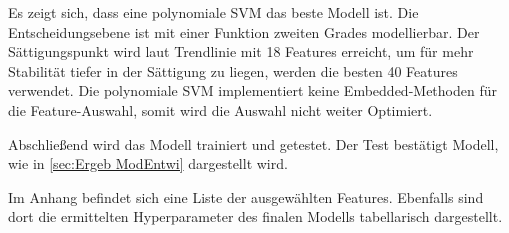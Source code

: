 Es zeigt sich, dass eine polynomiale SVM das beste Modell ist. Die Entscheidungsebene ist mit einer Funktion zweiten Grades modellierbar. Der Sättigungspunkt wird laut Trendlinie mit 18 Features erreicht, um für mehr Stabilität tiefer in der Sättigung zu liegen, werden die besten 40 Features verwendet. Die polynomiale SVM implementiert keine Embedded-Methoden für die Feature-Auswahl, somit wird die Auswahl nicht weiter Optimiert. \par

Abschließend wird das Modell trainiert und getestet. Der Test bestätigt Modell, wie in \ref{sec:Ergeb ModEntwi} dargestellt wird.\par

Im Anhang befindet sich eine Liste der ausgewählten Features. Ebenfalls sind dort die ermittelten Hyperparameter des finalen Modells tabellarisch dargestellt.